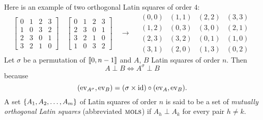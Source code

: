 \begin{xmpl}{}
    Here is an example of two orthogonal Latin squares of order $4$:
    \[
        \begin{bmatrix}
        0 & 1 & 2 & 3 \\
        1 & 0 & 3 & 2 \\
        2 & 3 & 0 & 1 \\
        3 & 2 & 1 & 0
        \end{bmatrix}
        \quad
        \begin{bmatrix}
        0 & 1 & 2 & 3 \\
        2 & 3 & 0 & 1 \\
        3 & 2 & 1 & 0 \\
        1 & 0 & 3 & 2
        \end{bmatrix}
        \quad\longrightarrow\quad
        \begin{matrix}
        (0,0) & (1,1) & (2,2) & (3,3) \\
        (1,2) & (0,3) & (3,0) & (2,1) \\
        (2,3) & (3,2) & (0,1) & (1,0) \\
        (3,1) & (2,0) & (1,3) & (0,2)
        \end{matrix}
    \]
    Let $\sigma$ be a permutation of $\nset[0]{n-1}$ and $A$, $B$ Latin squares of order $n$. Then
    \begin{equation}\label{eq:latin-orthogonal}
        A \perp B \iff A^\sigma \perp B
        \tag{$\star$}
    \end{equation}
    because
    \[
        (\ev{A^\sigma}, \ev B) = (\sigma \times \id) \circ (\ev A, \ev B).
    \]
    A set $\set{A_1, A_2, \dots, A_m}$ of Latin squares of order $n$ is said to be a set of \textsl{mutually orthogonal Latin squares} (abbreviated $\mols$) if $A_h\perp A_k$ for every pair $h\ne k$.
    

\end{xmpl}
